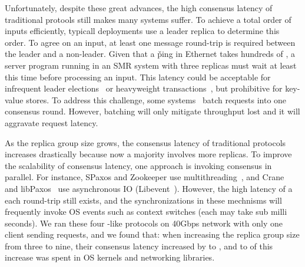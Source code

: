 Unfortunately, despite these great advances, the high consensus latency of 
traditional \paxos protools still makes many systems suffer. To achieve a total 
order of inputs efficiently, typicall \paxos deployments use a leader replica 
to determine this order. To agree on an input, at least one message round-trip 
is required between the leader and a non-leader. Given that a \v{ping} in 
Ethernet takes hundreds of \us, a server program running in an SMR 
system with three replicas must wait at least this time before processing an 
input. This latency could be acceptable for infrequent leader 
elections~\cite{chubby:osdi,zookeeper} or heavyweight 
transactions~\cite{crane:sosp15,eve:osdi12}, but prohibitive for key-value 
stores. To address this challenge, 
some systems~\cite{calvin:sigmod12,rex:eurosys14} batch requests into one 
consensus round. However, batching will only mitigate throughput lost and it 
will aggravate request latency. 


As the replica group size grows, the consensus latency of traditional \paxos 
protocols increases drastically because now a majority involves more replicas. 
To improve the scalability of consensus latency, one approach is invoking 
consensus in parallel. For instance, S\-Paxos and Zookeeper use 
multithreading~\cite{spaxos, zookeeper}, and Crane~\cite{crane:sosp15} and 
libPaxos~\cite{libpaxos} use asynchronous IO (Libevent~\cite{libevent}). 
However, the high latency of a each round-trip still exists, and the 
synchronizations in these mechnisms will frequently invoke OS events such as 
context switches (each may take sub milli seconds). We ran these four 
\paxos-like protocols on 40Gbps network with only one client sending requests, 
and we found that: when increasing the replica group size from three to nine, 
their consensus latency increased by \tradlatencyincreaselow to 
\tradlatencyincreasehigh, and \systemcostlow to \systemcosthigh of this 
increase was spent in OS kernels and networking libraries.

